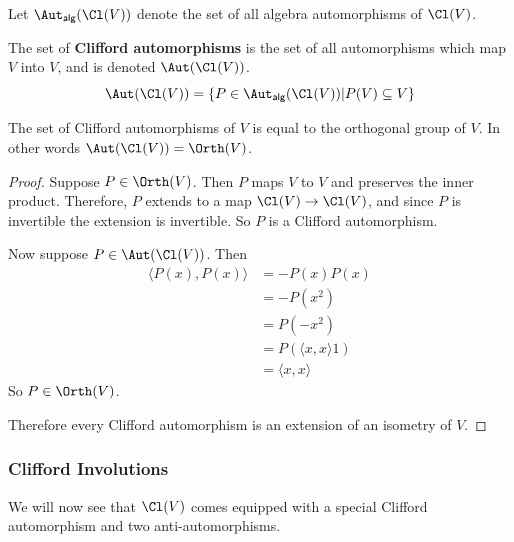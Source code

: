 \begin{defn}
    Let $\Aut_{\textsf{alg}}(\Cl(V))$ denote the set of all algebra automorphisms of $\Cl(V)$.

    The set of \textbf{Clifford automorphisms} is the set of all automorphisms which map $V$ into $V$, and is denoted $\Aut(\Cl(V))$.
\begin{equation}
    \Aut(\Cl(V)) = \{P \in \Aut_{\textsf{alg}}(\Cl(V)) | P(V)\subseteq V\}
\end{equation}
\end{defn}

\begin{thm} The set of Clifford automorphisms of $V$ is equal to the orthogonal group of $V$. In other words $\Aut(\Cl(V)) = \Orth(V)$.
\end{thm}
\begin{proof}
    Suppose $P \in \Orth(V)$. Then $P$ maps $V$ to $V$ and preserves the inner product. Therefore, $P$ extends to a map $\Cl(V) \to \Cl(V)$, and since $P$ is invertible the extension is invertible. So $P$ is a Clifford automorphism.

    Now suppose $P \in \Aut(\Cl(V))$. Then \begin{align*}\langle P(x),P(x)\rangle &= -P(x)P(x) \\&= -P(x^2) \\&= P(-x^2) \\&= P(\langle x,x\rangle 1) \\&= \langle x,x\rangle\end{align*}
    So $P \in \Orth(V)$.

    Therefore every Clifford automorphism is an extension of an isometry of $V$.
\end{proof}
\subsubsection{Clifford Involutions}
We will now see that $\Cl(V)$ comes equipped with a special Clifford automorphism and two anti-automorphisms.

